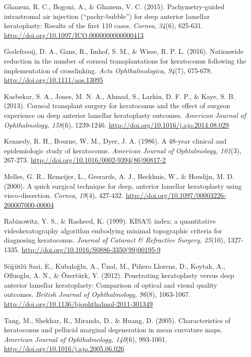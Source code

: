 \documentclass[authordate, empirical]{jote-new-article}
\begin{document}
	Ghanem, R. C., Bogoni, A., \& Ghanem, V. C. (2015). Pachymetry-guided intrastromal air injection (“pachy-bubble”) for deep anterior lamellar keratoplasty: Results of the first 110 cases. \emph{Cornea}, \emph{34}(6), 625-631. \url{http://doi.org/10.1097/ICO.0000000000000413}



	Godefrooij, D. A., Gans, R., Imhof, S. M., \& Wisse, R. P. L. (2016). Nationwide reduction in the number of corneal transplantations for keratoconus following the implementation of crosslinking. \emph{Acta Ophthalmologica, 94}(7), 675-678. \url{http://doi.org/10.1111/aos.13095}



	Kasbekar, S. A., Jones, M. N. A., Ahmad, S., Larkin, D. F. P., \& Kaye, S. B. (2013). Corneal transplant surgery for keratoconus and the effect of surgeon experience on deep anterior lamellar keratoplasty outcomes. \emph{American Journal of Ophthalmology, 158}(6), 1239-1246. \url{http://doi.org/10.1016/j.ajo.2014.08.029}



	Kennedy, R. H., Bourne, W. M., Dyer, J. A. (1986). A 48-year clinical and epidemiologic study of keratoconus. \emph{American Journal of Ophtalmology, 101}(3), 267-273. \url{http://doi.org/10.1016/0002-9394(86)90817-2}



	Melles, G. R., Remeijer, L., Geerards, A. J., Beekhuis, W., \& Houdijn, M. D. (2000). A quick surgical technique for deep, anterior lamellar keratoplasty using visco-dissection. \emph{Cornea}, \emph{19}(4), 427-432. \url{http://doi.org/10.1097/00003226-200007000-00004}



	Rabinowitz, Y. S., \& Rasheed, K. (1999). KISA\% index: a quantitative videokeratography algorithm embodying minimal topographic criteria for diagnosing keratoconus. \emph{Journal of Cataract \& Refractive Surgery, 25}(10), 1327-1335. \url{http://doi.org/10.1016/S0886-3350(99)00195-9}



	Söğütlü Sari, E., Kubaloğlu, A., Ünal, M., Piñero Llorens, D., Koytak, A., Ofluoglu, A. N., \& Özertürk, Y. (2012). Penetrating keratoplasty versus deep anterior lamellar keratoplasty: Comparison of optical and visual quality outcomes. \emph{British Journal of Ophthalmology, 96}(8), 1063-1067. \url{http://doi.org/10.1136/bjophthalmol-2011-301349}



	Tang, M., Shekhar, R., Miranda, D., \& Huang, D. (2005). Characteristics of keratoconus and pellucid marginal degeneration in mean curvature maps. \emph{American Journal of Ophthalmology, 140}(6), 993-1001. \url{http://doi.org/10.1016/j.ajo.2005.06.026}
\end{document}
